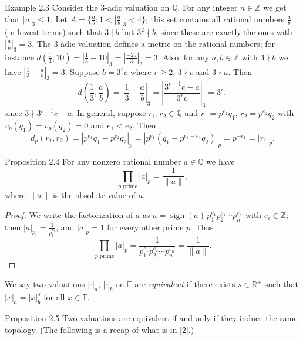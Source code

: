 \documentclass[11pt]{article}
\begin{document}
\begin{exbox}{Example 2.3}
Consider the $3$-adic valuation on $\mathbb{Q}$. For any integer $n \in \mathbb{Z}$ we get that $|n|_3 \leq 1$. Let $A = \{\frac{a}{b} : 1 < |\frac{a}{b}|_3 < 4\}$; this set contains all rational numbers $\frac{a}{b}$ (in lowest terms) such that $3 \mid b$ but $3^2 \nmid b$, since these are exactly the ones with $|\frac{a}{b}|_3 = 3$. The $3$-adic valuation defines a metric on the rational numbers; for instance $d(\frac13, 10) = |\frac13 - 10|_3 = |\frac{-29}{3}|_3 = 3$. Also, for any $a, b \in \mathbb{Z}$ with $3 \nmid b$ we have $|\frac13 - \frac{a}{b}|_3 = 3$. Suppose $b = 3^r c$ where $r \geq 2$, $3 \nmid c$ and $3 \nmid a$. Then
\[
d\left(\frac13, \frac{a}{b}\right) = \left| \frac13 - \frac{a}{b} \right|_3 = \left| \frac{3^{r-1}c - a}{3^r c} \right|_3 = 3^r ,
\]
since $3 \nmid 3^{r-1}c - a$. In general, suppose $r_1, r_2 \in \mathbb{Q}$ and $r_1 = p^{e_1}q_1$, $r_2 = p^{e_2}q_2$ with $v_p(q_1) = v_p(q_2) = 0$ and $e_1 < e_2$. Then
\[
d_p(r_1, r_2) = |p^{e_1}q_1 - p^{e_2}q_2|_p = |p^{e_1}(q_1 - p^{e_2 - e_1}q_2)|_p = p^{-e_1} = |r_1|_p .
\]
\end{exbox}

\begin{thmbox}{Proposition 2.4}
For any nonzero rational number $a \in \mathbb{Q}$ we have
\[
\prod_{p \text{ prime}} |a|_p = \frac{1}{\|a\|},
\]
where $\|a\|$ is the absolute value of $a$.
\end{thmbox}

\begin{proof}
We write the factorization of $a$ as $a = \operatorname{sign}(a)\, p_1^{e_1} p_2^{e_2} \cdots p_n^{e_n}$ with $e_i \in \mathbb{Z}$; then $|a|_{p_i} = \frac{1}{p_i^{e_i}}$, and $|a|_p = 1$ for every other prime $p$. Thus
\[
\prod_{p \text{ prime}} |a|_p = \frac{1}{p_1^{e_1} p_2^{e_2} \cdots p_n^{e_n}} = \frac{1}{\|a\|} .
\]
\end{proof}

We say two valuations $|\cdot|_a$, $|\cdot|_b$ on $\mathbb{F}$ are \textit{equivalent} if there exists $s \in \mathbb{R}^+$ such that $|x|_a = |x|_b^s$ for all $x \in \mathbb{F}$.

\begin{thmbox}{Proposition 2.5}
Two valuations are equivalent if and only if they induce the same topology. (The following is a recap of what is in [2].)
\end{thmbox}
\end{document}

